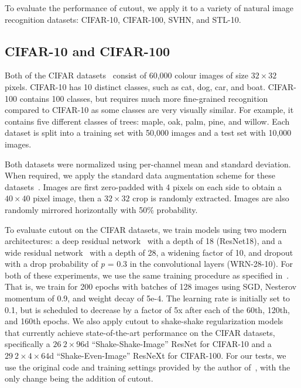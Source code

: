 \documentclass[10pt,twocolumn,letterpaper]{article}
\begin{document}
To evaluate the performance of cutout, we apply it to a variety of natural image recognition datasets: CIFAR-10, CIFAR-100, SVHN, and STL-10.

\subsection{CIFAR-10 and CIFAR-100}
\label{sec:cifar10_and_cifar100}

Both of the CIFAR datasets~\cite{krizhevsky2009learning} consist of 60,000 colour images of size $32 \times 32$ pixels. CIFAR-10 has 10 distinct classes, such as cat, dog, car, and boat. CIFAR-100 contains 100 classes, but requires much more fine-grained recognition compared to CIFAR-10 as some classes are very visually similar. For example, it contains five different classes of trees: maple, oak, palm, pine, and willow. Each dataset is split into a training set with 50,000 images and a test set with 10,000 images.

Both datasets were normalized using per-channel mean and standard deviation. When required, we apply the standard data augmentation scheme for these datasets~\cite{he2016identity}. Images are first zero-padded with 4 pixels on each side to obtain a $40 \times 40$ pixel image, then a $32 \times 32$ crop is randomly extracted. Images are also randomly mirrored horizontally with 50\% probability.

To evaluate cutout on the CIFAR datasets, we train models using two modern architectures: a deep residual network~\cite{he2016identity} with a depth of 18 (ResNet18), and a wide residual network~\cite{zagoruyko2016wide} with a depth of 28, a widening factor of 10, and dropout with a drop probability of \textit{p} = 0.3 in the convolutional layers (WRN-28-10). For both of these experiments, we use the same training procedure as specified in~\cite{zagoruyko2016wide}. That is, we train for 200 epochs with batches of 128 images using SGD, Nesterov momentum of 0.9, and weight decay of 5e-4. The learning rate is initially set to 0.1, but is scheduled to decrease by a factor of 5x after each of the 60th, 120th, and 160th epochs. We also apply cutout to shake-shake regularization models~\cite{gastaldi2017shake} that currently achieve state-of-the-art performance on the CIFAR datasets, specifically a $26\ 2 \times 96$d ``Shake-Shake-Image'' ResNet for CIFAR-10 and a $29\ 2 \times 4 \times 64$d ``Shake-Even-Image'' ResNeXt for CIFAR-100. For our tests, we use the original code and training settings provided by the author of~\cite{gastaldi2017shake}, with the only change being the addition of cutout.
\end{document}
